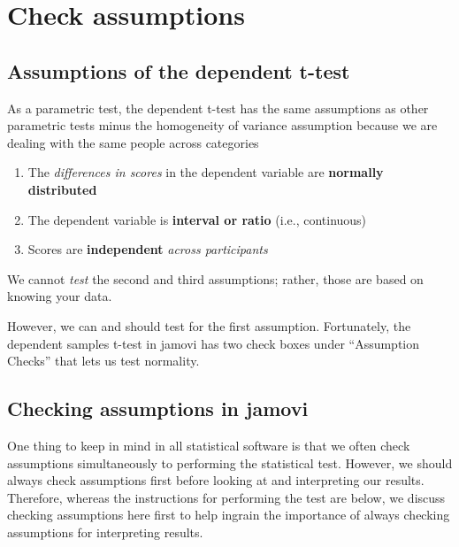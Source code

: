 \documentclass[
]{book}
\begin{document}
\hypertarget{check-assumptions-1}{%
\section{Check assumptions}\label{check-assumptions-1}}

\hypertarget{assumptions-of-the-dependent-t-test}{%
\subsection{Assumptions of the dependent t-test}\label{assumptions-of-the-dependent-t-test}}

As a parametric test, the dependent t-test has the same assumptions as other parametric tests minus the homogeneity of variance assumption because we are dealing with the same people across categories

\begin{enumerate}
\def\labelenumi{\arabic{enumi}.}
\item
  The \emph{differences in scores} in the dependent variable are \textbf{normally distributed}
\item
  The dependent variable is \textbf{interval or ratio} (i.e., continuous)
\item
  Scores are \textbf{independent} \emph{across participants}
\end{enumerate}

We cannot \emph{test} the second and third assumptions; rather, those are based on knowing your data.

However, we can and should test for the first assumption. Fortunately, the dependent samples t-test in jamovi has two check boxes under ``Assumption Checks'' that lets us test normality.

\hypertarget{checking-assumptions-in-jamovi-1}{%
\subsection{Checking assumptions in jamovi}\label{checking-assumptions-in-jamovi-1}}

One thing to keep in mind in all statistical software is that we often check assumptions simultaneously to performing the statistical test. However, we should always check assumptions first before looking at and interpreting our results. Therefore, whereas the instructions for performing the test are below, we discuss checking assumptions here first to help ingrain the importance of always checking assumptions for interpreting results.
\end{document}
